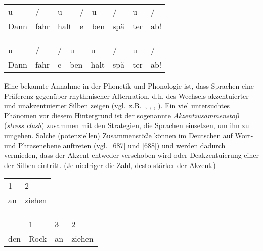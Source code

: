 \begin{exe}
	\ex\label{686} 
	\begin{xlist} 
	\ex\label{686a}
	\begin{tabular}[t]{llllllll}
	u & / & u & / & u & / & u & /\\
	Dann & fahr & halt & e & ben & spä & ter & ab!
    \end{tabular}
    \ex\label{686b}
	\begin{tabular}[t]{llllllll}
	u & / & / & u & u & / & u & /\\
	Dann & fahr & e & ben & halt & spä & ter & ab!
    \end{tabular}
\end{xlist}    
\end{exe}\pagebreak		
Eine bekannte Annahme in der Phonetik und Phonologie ist, dass Sprachen eine Präferenz gegenüber rhythmischer Alternation, d.h. des Wechsels akzentuierter und unakzentuierter Silben zeigen (vgl.\ z.B.\ \citealt[1]{Wagner2002}, \citealt[141]{Gussenhoven2004}, \citealt[18--24]{Schlueter2005}, \citealt[332]{Bohn2011}). Ein viel untersuchtes Phänomen vor diesem Hintergrund ist der sogenannte \textit{Akzentzusammenstoß} (\textit{stress clash}) zusammen mit den Strategien, die Sprachen einsetzen, um ihn zu umgehen. Solche (potenziellen) Zusammenstöße können im Deutschen auf Wort- und Phrasenebene auftreten (vgl.\ \ref{687} und \ref{688}) und werden dadurch vermieden, dass der Akzent entweder verschoben wird oder Deakzentuierung einer der Silben eintritt. (Je niedriger die Zahl, desto stärker der Akzent.)

\begin{exe}
	\ex\label{687} 
	\begin{xlist} 
	\ex\label{687a}
	\begin{tabular}[t]{ll}
	1 & 2 \\
	an & ziehen
    \end{tabular}
    \ex\label{687b}
	\begin{tabular}[t]{llll}
	{} & 1 & 3 & 2 \\
	den & Rock & an & ziehen
    \end{tabular}
\end{xlist}    
\end{exe}

